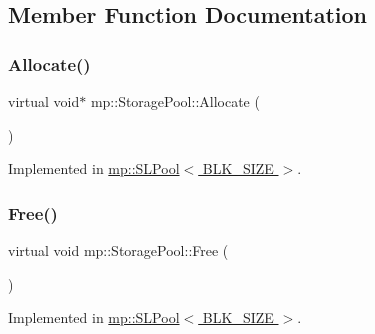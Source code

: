 \subsection{Member Function Documentation}
\mbox{\label{classmp_1_1_storage_pool_a7970f46f34c0e532544888ecaf10b4c9}} 
\subsubsection{\texorpdfstring{Allocate()}{Allocate()}}
{\footnotesize\ttfamily virtual void$\ast$ mp\+::\+Storage\+Pool\+::\+Allocate (\begin{DoxyParamCaption}\item[{size\+\_\+t}]{ }\end{DoxyParamCaption})\hspace{0.3cm}{\ttfamily [pure virtual]}}



Implemented in \hyperlink{classmp_1_1_s_l_pool_a543f5c4b2d190bbfc89170a227dc92a8}{mp\+::\+S\+L\+Pool$<$ B\+L\+K\+\_\+\+S\+I\+Z\+E $>$}.

\mbox{\label{classmp_1_1_storage_pool_a5a186404980f6c958a30373f810ebd4f}} 
\subsubsection{\texorpdfstring{Free()}{Free()}}
{\footnotesize\ttfamily virtual void mp\+::\+Storage\+Pool\+::\+Free (\begin{DoxyParamCaption}\item[{void $\ast$}]{ }\end{DoxyParamCaption})\hspace{0.3cm}{\ttfamily [pure virtual]}}



Implemented in \hyperlink{classmp_1_1_s_l_pool_a605b83d9042098aabaf19e3796222a74}{mp\+::\+S\+L\+Pool$<$ B\+L\+K\+\_\+\+S\+I\+Z\+E $>$}.

